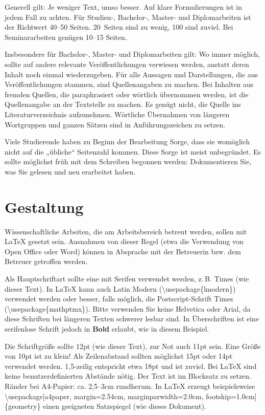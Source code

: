 \documentclass[
    fontsize=12pt,
    headings=small,
    parskip=half,           %
    bibliography=totoc,
    numbers=noenddot,       %
    open=any,               %
    ]{scrreprt}
\begin{document}
Generell gilt: Je weniger Text, umso besser. Auf klare Formulierungen ist in jedem Fall zu achten. Für Studien-, Bachelor-, Master- und Diplomarbeiten ist der Richtwert 40--50 Seiten. 20~Seiten sind zu wenig, 100 sind zuviel. Bei Seminararbeiten genügen 10--15 Seiten.

Insbesondere für Bachelor-, Master- und Diplomarbeiten gilt: Wo immer möglich, sollte auf andere relevante Veröffentlichungen verwiesen werden, anstatt deren Inhalt noch einmal wiederzugeben. Für alle Aussagen und Darstellungen, die aus Veröffentlichungen stammen, sind Quellenangaben zu machen. Bei Inhalten aus fremden Quellen, die paraphrasiert oder wörtlich übernommen werden, ist die Quellenangabe an der Textstelle zu machen. Es genügt nicht, die Quelle ins Literaturverzeichnis aufzunehmen. Wörtliche Übernahmen von längeren Wortgruppen und ganzen Sätzen sind in Anführungszeichen zu setzen.

Viele Studierende haben zu Beginn der Bearbeitung Sorge, dass sie womöglich nicht auf die „übliche“ Seitenzahl kommen. Diese Sorge ist meist unbegründet. Es sollte möglichst früh mit dem Schreiben begonnen werden: Dokumentieren Sie, was Sie gelesen und neu erarbeitet haben.

\section{Gestaltung}

Wissenschaftliche Arbeiten, die am Arbeitsbereich betreut werden, sollen mit LaTeX gesetzt sein. Ausnahmen von dieser Regel (etwa die Verwendung von Open Office oder Word) können in Absprache mit der Betreuerin bzw. dem Betreuer getroffen werden.

Als Hauptschriftart sollte eine mit Serifen verwendet werden, z.\,B. Times (wie dieser Text). In LaTeX kann auch Latin Modern (\textbackslash usepackage\{lmodern\}) verwendet werden oder besser, falls möglich, die Postscript-Schrift Times (\textbackslash usepackage\{mathptmx\}). Bitte verwenden Sie keine \textsf{Helvetica} oder \textsf{Arial}, da diese Schriften bei längeren Texten schwerer lesbar sind. In Überschriften ist eine serifenlose Schrift jedoch in \textsf{\textbf{Bold}} erlaubt, wie in diesem Beispiel.

Die Schriftgröße sollte 12pt (wie dieser Text), zur Not auch 11pt sein. Eine Größe von 10pt ist zu klein! Als Zeilenabstand sollten möglichst 15pt oder 14pt verwendet werden. 1,5-zeilig entspricht etwa 18pt und ist zuviel. Bei LaTeX sind keine benutzerdefinierten Abstände nötig. Der Text ist im Blocksatz zu setzen. Ränder bei A4-Papier: ca. 2,5--3cm rundherum. In LaTeX erzeugt beispielsweise \textbackslash usepackage[a4paper, margin=2.54cm, marginparwidth=2.0cm, footskip=1.0cm]\{geometry\} einen geeigneten Satzspiegel (wie dieses Dokument).
\end{document}
